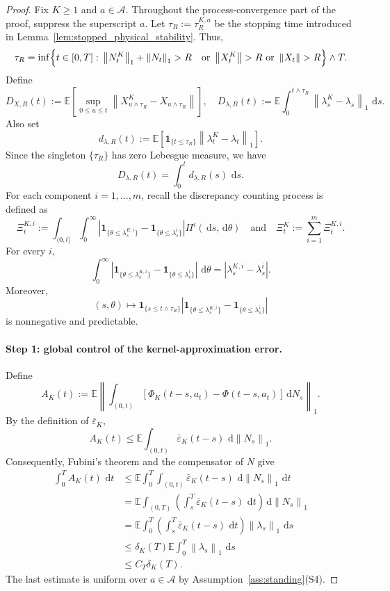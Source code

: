 \documentclass[11pt]{article}
\theoremstyle{remarkitalic}
\theoremstyle{remarkitalic}
\newcommand{\E}{\mathbb E}
\newcommand{\dd}{\,\mathrm d}
\newcommand{\1}{\mathbf 1}
\newcommand{\norm}[1]{\left\lVert #1 \right\rVert}
\newcommand{\abs}[1]{\left\lvert #1\right\rvert}
\begin{document}
{\begin{proof}
Fix $K\geq1$ and $a\in\mathcal A$. Throughout the
process-convergence part of the proof, suppress the superscript
$a$. Let
$\tau_R:=\tau_R^{K,a}$
be the stopping time introduced in
Lemma~\ref{lem:stopped_physical_stability}. Thus,
\[
\begin{aligned}
\tau_R
=
\inf\Bigl\{
t\in[0,T]:\;&
\norm{N_t^K}_1+\norm{N_t}_1>R
&\text{or }\norm{X_t^K}>R
\text{ or }\norm{X_t}>R
\Bigr\}
\wedge T.
\end{aligned}
\] Define
\[
D_{X,R}(t)
:=
\E\left[
    \sup_{0\leq u\leq t}
    \norm{
        X_{u\wedge\tau_R}^K-X_{u\wedge\tau_R}
    }
\right],\quad D_{\lambda,R}(t)
:=
\E\int_0^{t\wedge\tau_R}
\norm{\lambda_s^K-\lambda_s}_1\,\dd s.
\]
Also set
\[
d_{\lambda,R}(t)
:=
\E\left[
    \mathbf 1_{\{t\leq\tau_R\}}
    \norm{\lambda_t^K-\lambda_t}_1
\right].
\]
Since the singleton $\{\tau_R\}$ has zero Lebesgue measure, we have
\[
D_{\lambda,R}(t)
=
\int_0^t d_{\lambda,R}(s)\,\dd s.
\] For each component $i=1,\ldots,m$, recall the discrepancy counting
process is defined as
\[
\Xi_t^{K,i}
:=
\int_{(0,t]}\int_0^\infty
\left|
    \mathbf 1_{\{\theta\leq\lambda_s^{K,i}\}}
    -
    \mathbf 1_{\{\theta\leq\lambda_s^i\}}
\right|
\Pi^i(\dd s,\dd\theta)\quad\mbox{and}\quad
    \Xi_t^K:=\sum_{i=1}^m\Xi_t^{K,i}.
\] For every $i$,
\[
\int_0^\infty
\left|
    \mathbf 1_{\{\theta\leq\lambda_s^{K,i}\}}
    -
    \mathbf 1_{\{\theta\leq\lambda_s^i\}}
\right|
\,\dd\theta
=
\abs{\lambda_s^{K,i}-\lambda_s^i}.
\]
Moreover,
\[
(s,\theta)
\longmapsto
\mathbf 1_{\{s\leq t\wedge\tau_R\}}
\left|
    \mathbf 1_{\{\theta\leq\lambda_s^{K,i}\}}
    -
    \mathbf 1_{\{\theta\leq\lambda_s^i\}}
\right|
\]
is nonnegative and predictable. 

\paragraph{Step 1: global control of the kernel-approximation error.}

Define
\[
A_K(t)
:=
\E\left\|
    \int_{(0,t)}
    \left[
        \Phi_K(t-s,a_t)-\Phi(t-s,a_t)
    \right]\dd N_s
\right\|_1.
\]
By the definition of
$\bar\varepsilon_K$,
\[
A_K(t)
\leq
\E\int_{(0,t)}
\bar\varepsilon_K(t-s)\,
\dd\norm{N_s}_1.
\]
Consequently, Fubini's theorem and the compensator of $N$ give
\begin{align*}
\int_0^T A_K(t)\,\dd t
&\leq
\E\int_0^T\int_{(0,t)}
\bar\varepsilon_K(t-s)\,
\dd\norm{N_s}_1\,\dd t
\nonumber\\
&=
\E\int_{(0,T)}
\left(
    \int_s^T
    \bar\varepsilon_K(t-s)\,\dd t
\right)
\dd\norm{N_s}_1
\nonumber\\
&=
\E\int_0^T
\left(
    \int_s^T
    \bar\varepsilon_K(t-s)\,\dd t
\right)
\norm{\lambda_s}_1\,\dd s
\nonumber\\
&\leq
\delta_K(T)
\E\int_0^T\norm{\lambda_s}_1\,\dd s
\nonumber\\
&\leq
C_T\delta_K(T).
\end{align*}
The last estimate is uniform over $a\in\mathcal A$ by
Assumption~\ref{ass:standing}(S4).


\end{proof}}
\end{document}
